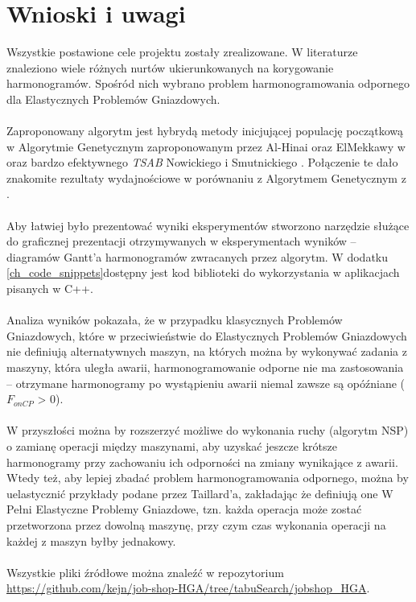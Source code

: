 \documentclass[printmode,oneside]{mgr}
\begin{document}
\chapter*{Wnioski i uwagi}
Wszystkie postawione cele projektu zostały zrealizowane. W literaturze znaleziono wiele różnych nurtów ukierunkowanych na korygowanie harmonogramów. Spośród nich wybrano problem harmonogramowania odpornego dla Elastycznych Problemów Gniazdowych.\\\\
Zaproponowany algorytm jest hybrydą metody inicjującej populację początkową w Algorytmie Genetycznym zaproponowanym przez Al-Hinai oraz ElMekkawy w \cite{AEHGAFJS_ElMekkawy11} oraz bardzo efektywnego \emph{TSAB} Nowickiego i Smutnickiego \cite{Smutnicki96}. Połączenie te dało znakomite rezultaty wydajnościowe w porównaniu z Algorytmem Genetycznym z \cite{AEHGAFJS_ElMekkawy11}.\\\\
Aby łatwiej było prezentować wyniki eksperymentów stworzono narzędzie służące do graficznej prezentacji otrzymywanych w eksperymentach wyników -- diagramów Gantt'a harmonogramów zwracanych przez algorytm. W dodatku \ref{ch_code_snippets}dostępny jest kod biblioteki do wykorzystania w aplikacjach pisanych w C++.\\\\
Analiza wyników pokazała, że w przypadku klasycznych Problemów Gniazdowych, które w przeciwieństwie do Elastycznych Problemów Gniazdowych nie definiują alternatywnych maszyn, na których można by wykonywać zadania z maszyny, która uległa awarii, harmonogramowanie odporne nie ma zastosowania -- otrzymane harmonogramy po wystąpieniu awarii niemal zawsze są opóźniane ($F_{onCP}$ > 0).\\\\
W przyszłości można by rozszerzyć możliwe do wykonania ruchy (algorytm NSP) o zamianę operacji między maszynami, aby uzyskać jeszcze krótsze harmonogramy przy zachowaniu ich odporności na zmiany wynikające z awarii. Wtedy też, aby lepiej zbadać problem harmonogramowania odpornego, można by uelastycznić przykłady podane przez Taillard'a, zakładając że definiują one W Pełni Elastyczne Problemy Gniazdowe, tzn. każda operacja może zostać przetworzona przez dowolną maszynę, przy czym czas wykonania operacji na każdej z maszyn byłby jednakowy.\\\\
Wszystkie pliki źródłowe można znaleźć w repozytorium \url{https://github.com/kejn/job-shop-HGA/tree/tabuSearch/jobshop_HGA}.
\end{document}
